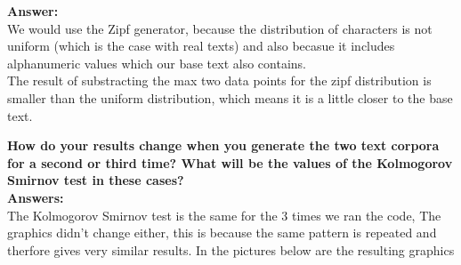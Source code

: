 \documentclass{WeSTassignment}
\begin{document}
\textbf{Answer:}
\\ We would use the Zipf generator, because the distribution of characters is not uniform (which is the case with real texts) and also becasue it includes alphanumeric values which our base text also contains.
\\ The result of substracting the max two data points for the zipf distribution is smaller than the uniform distribution, which means it is a little closer to the base text.


\textbf{How do your results change when you generate the two text corpora for a second or third time? What will be the values of the Kolmogorov Smirnov test in these cases?}\\

\textbf{Answers:}
\\The Kolmogorov Smirnov test is the same for the 3 times we ran the code, The graphics didn't change either, this is because the same pattern is repeated and therfore gives very similar results. In the pictures below are the resulting graphics
\end{document}
